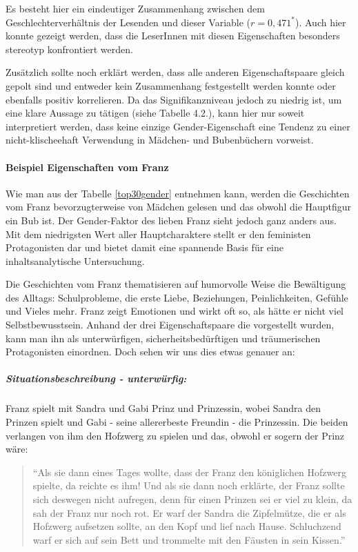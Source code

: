 Es besteht hier ein eindeutiger Zusammenhang zwischen dem
Geschlechterverhältnis der Lesenden und dieser Variable
($r= 0{,}471^*$). Auch hier konnte gezeigt werden, dass die LeserInnen
mit diesen Eigenschaften besonders stereotyp konfrontiert werden.

Zusätzlich sollte noch erklärt werden, dass alle anderen
Eigenschaftspaare gleich gepolt sind und entweder kein Zusammenhang
festgestellt werden konnte oder ebenfalls positiv korrelieren. Da das
Signifikanzniveau jedoch zu niedrig ist, um eine klare Aussage zu
tätigen (siehe Tabelle 4.2.), kann hier nur soweit interpretiert werden,
dass keine einzige Gender-Eigenschaft eine Tendenz zu einer
nicht-klischeehaft Verwendung in Mädchen- und Bubenbüchern vorweist.

\paragraph{Beispiel Eigenschaften vom Franz}

Wie man aus der Tabelle \ref{top30gender} entnehmen kann, werden die
Geschichten vom Franz bevorzugterweise von Mädchen gelesen und das
obwohl die Hauptfigur ein Bub ist. Der Gender-Faktor des lieben Franz
sieht jedoch ganz anders aus. Mit dem niedrigsten Wert aller
Hauptcharaktere stellt er den feministen Protagonisten dar und bietet
damit eine spannende Basis für eine inhaltsanalytische Untersuchung.

Die Geschichten vom Franz thematisieren auf humorvolle Weise die
Bewältigung des Alltags: Schulprobleme, die erste Liebe, Beziehungen,
Peinlichkeiten, Gefühle und Vieles mehr. Franz zeigt Emotionen und wirkt
oft so, als hätte er nicht viel Selbstbewusstsein. Anhand der drei
Eigenschaftspaare die vorgestellt wurden, kann man ihn als
unterwürfigen, sicherheitsbedürftigen und träumerischen Protagonisten
einordnen. Doch sehen wir uns dies etwas genauer an:

\subparagraph{Situationsbeschreibung - unterwürfig:}

Franz spielt mit Sandra und Gabi Prinz und Prinzessin, wobei Sandra den
Prinzen spielt und Gabi - seine allererbeste Freundin - die Prinzessin.
Die beiden verlangen von ihm den Hofzwerg zu spielen und das, obwohl er
sogern der Prinz wäre:

\begin{quote}
``Als sie dann eines Tages wollte, dass der Franz den königlichen
Hofzwerg spielte, da reichte es ihm! Und als sie dann noch erklärte, der
Franz sollte sich deswegen nicht aufregen, denn für einen Prinzen sei er
viel zu klein, da sah der Franz nur noch rot. Er warf der Sandra die
Zipfelmütze, die er als Hofzwerg aufsetzen sollte, an den Kopf und lief
nach Hause. Schluchzend warf er sich auf sein Bett und trommelte mit den
Fäusten in sein Kissen.'' \parencite[][30]{Noestlinger2010}
\end{quote}

